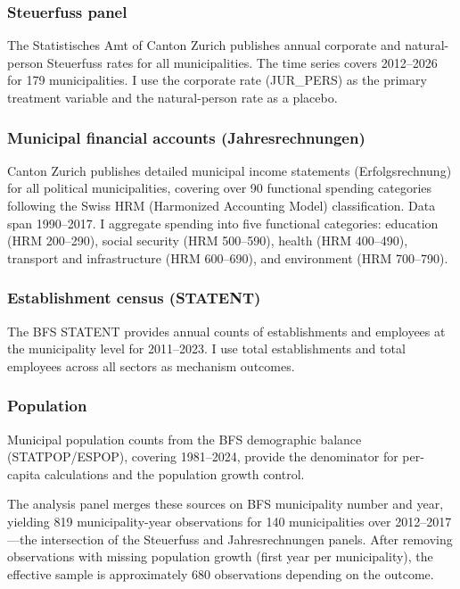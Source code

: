 \documentclass[12pt]{article}
\begin{document}
\subsubsection*{Steuerfuss panel} The Statistisches Amt of Canton Zurich publishes annual corporate and natural-person Steuerfuss rates for all municipalities. The time series covers 2012--2026 for 179 municipalities. I use the corporate rate (JUR\_PERS) as the primary treatment variable and the natural-person rate as a placebo.

\subsubsection*{Municipal financial accounts (Jahresrechnungen)} Canton Zurich publishes detailed municipal income statements (Erfolgsrechnung) for all political municipalities, covering over 90 functional spending categories following the Swiss HRM (Harmonized Accounting Model) classification. Data span 1990--2017. I aggregate spending into five functional categories: education (HRM 200--290), social security (HRM 500--590), health (HRM 400--490), transport and infrastructure (HRM 600--690), and environment (HRM 700--790).

\subsubsection*{Establishment census (STATENT)} The BFS STATENT provides annual counts of establishments and employees at the municipality level for 2011--2023. I use total establishments and total employees across all sectors as mechanism outcomes.

\subsubsection*{Population} Municipal population counts from the BFS demographic balance (STATPOP/ESPOP), covering 1981--2024, provide the denominator for per-capita calculations and the population growth control.

The analysis panel merges these sources on BFS municipality number and year, yielding 819 municipality-year observations for 140 municipalities over 2012--2017---the intersection of the Steuerfuss and Jahresrechnungen panels. After removing observations with missing population growth (first year per municipality), the effective sample is approximately 680 observations depending on the outcome.


\end{document}
